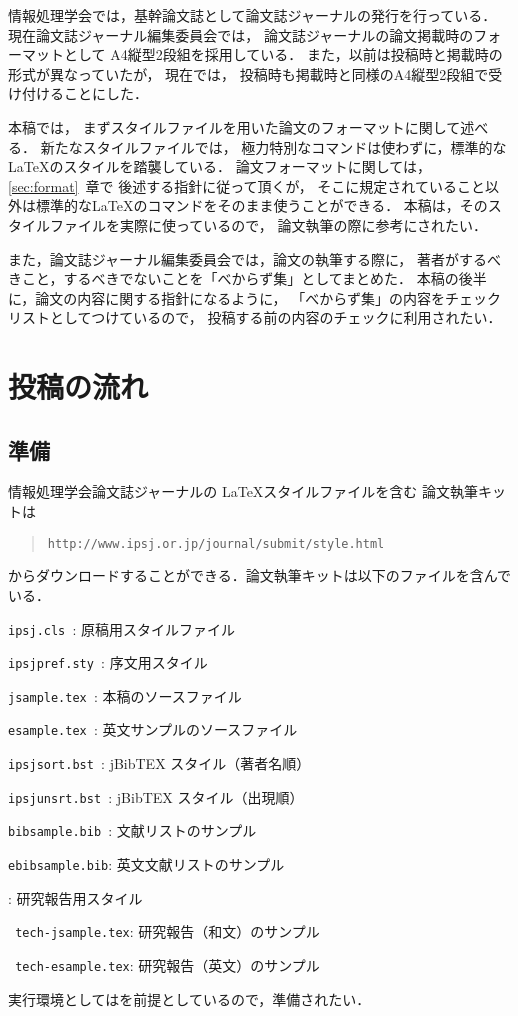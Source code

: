 \documentclass[submit]{ipsj}
\def\|{\verb|}
\begin{document}
情報処理学会では，基幹論文誌として論文誌ジャーナルの発行を行っている．
現在論文誌ジャーナル編集委員会では，
論文誌ジャーナルの論文掲載時のフォーマットとして
A4縦型2段組を採用している．
また，以前は投稿時と掲載時の形式が異なっていたが，
現在では，
投稿時も掲載時と同様のA4縦型2段組で受け付けることにした．

本稿では，
まずスタイルファイルを用いた論文のフォーマットに関して述べる．
新たなスタイルファイルでは，
極力特別なコマンドは使わずに，標準的な \LaTeX のスタイルを踏襲している．
論文フォーマットに関しては，\ref{sec:format}~章で
後述する指針に従って頂くが，
そこに規定されていること以外は標準的な\LaTeX のコマンドをそのまま使うことができる．
本稿は，そのスタイルファイルを実際に使っているので，
論文執筆の際に参考にされたい．


また，論文誌ジャーナル編集委員会では，論文の執筆する際に，
著者がするべきこと，するべきでないことを「べからず集」としてまとめた．
本稿の後半に，論文の内容に関する指針になるように，
「べからず集」の内容をチェックリストとしてつけているので，
投稿する前の内容のチェックに利用されたい．

%2
\section{投稿の流れ}

%2.1
\subsection{準備}

情報処理学会論文誌ジャーナルの \LaTeX スタイルファイルを含む
論文執筆キットは
\begin{quote}
	\small
	\|http://www.ipsj.or.jp/journal/submit/style.html|
\end{quote}
からダウンロードすることができる．論文執筆キットは以下のファイルを含んでいる．

\begin{Enumerate}
	\item \|ipsj.cls |: 原稿用スタイルファイル
	\item \|ipsjpref.sty |: 序文用スタイル
	\item \|jsample.tex |: 本稿のソースファイル
	\item \|esample.tex |: 英文サンプルのソースファイル
	\item \|ipsjsort.bst |: jBibTEX スタイル（著者名順）
	\item \|ipsjunsrt.bst |: jBibTEX スタイル（出現順）
	\item \|bibsample.bib |: 文献リストのサンプル
	\item \|ebibsample.bib|: 英文文献リストのサンプル
	\item {}: 研究報告用スタイル
	\item \| tech-jsample.tex|: 研究報告（和文）のサンプル
	\item \| tech-esample.tex|: 研究報告（英文）のサンプル
\end{Enumerate}%
実行環境としては\LaTeXe を前提としているので，準備されたい．
\end{document}
